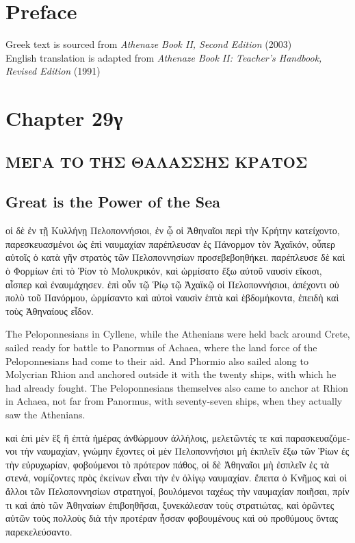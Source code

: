 \documentclass{article}
\begin{document}
\section{Preface}

Greek text is sourced from \emph{Athenaze Book II, Second Edition} (2003) \\
English translation is adapted from \emph{Athenaze Book II: Teacher's Handbook, Revised Edition} (1991) \\

\section{Chapter 29\textgreek{γ}}

\subsection*{\textgreek{ΜΕΓΑ ΤΟ ΤΗΣ ΘΑΛΑΣΣΗΣ ΚΡΑΤΟΣ}}
\subsection*{Great is the Power of the Sea}

\begin{greek}
οἱ δὲ ἐν τῇ Κυλλήνῃ Πελοποννήσιοι, ἐν ᾧ οἱ Ἀθηναῖοι περὶ τὴν Κρήτην κατείχοντο,
παρεσκευασμένοι ὡς ἐπὶ ναυμαχίαν παρέπλευσαν ἐς Πάνορμον τὸν Ἀχαϊκόν,
οὗπερ αὐτοῖς ὁ κατὰ γῆν στρατὸς τῶν Πελοποννησίων προσεβεβοηθήκει.
παρέπλευσε δὲ καὶ ὁ Φορμίων ἐπὶ τὸ Ῥίον τὸ Μολυκρικόν, καὶ ὡρμίσατο ἔξω αὐτοῦ ναυσὶν εἴκοσι, αἷσπερ καὶ ἐναυμάχησεν.
ἐπὶ οὖν τῷ Ῥίῳ τῷ Ἀχαϊκῷ οἱ Πελοποννήσιοι, ἀπέχοντι οὐ πολὺ τοῦ Πανόρμου,
ὡρμίσαντο καὶ αὐτοὶ ναυσὶν ἑπτὰ καὶ ἑβδομήκοντα, ἐπειδὴ καὶ τοὺς Ἀθηναίους εἶδον. \\
\end{greek}


The Peloponnesians in Cyllene, while the Athenians were held back around Crete,
sailed ready for battle to Panormus of Achaea,
where the land force of the Peloponnesians had come to their aid.
And Phormio also sailed along to Molycrian Rhion and anchored outside it with the twenty ships,
with which he had already fought.
The Peloponnesians themselves also came to anchor at Rhion in Achaea,
not far from Panormus, with seventy-seven ships, when they actually saw the Athenians. \\


\begin{greek}
καὶ ἐπὶ μὲν ἓξ ἢ ἑπτὰ ἡμέρας ἀνθώρμουν ἀλλήλοις,
μελετῶντές τε καὶ παρασκευαζόμενοι τὴν ναυμαχίαν,
γνώμην ἔχοντες οἱ μὲν Πελοποννήσιοι μὴ ἐκπλεῖν ἔξω τῶν Ῥίων ἐς τὴν εὐρυχωρίαν,
φοβούμενοι τὸ πρότερον πάθος, οἱ δὲ Ἀθηναῖοι μὴ ἐσπλεῖν ἐς τὰ στενά,
νομίζοντες πρὸς ἐκείνων εἶναι τὴν ἐν ὀλίγῳ ναυμαχίαν.
ἔπειτα ὁ Κνῆμος καὶ οἱ ἄλλοι τῶν Πελοποννησίων στρατηγοί, βουλόμενοι ταχέως τὴν ναυμαχίαν ποιῆσαι,
πρίν τι καὶ ἀπὸ τῶν Ἀθηναίων ἐπιβοηθῆσαι, ξυνεκάλεσαν τοὺς στρατιώτας,
καὶ ὁρῶντες αὐτῶν τοὺς πολλοὺς διὰ τὴν προτέραν ἧσσαν φοβουμένους
καὶ οὐ προθύμους ὄντας παρεκελεύσαντο. \\
\end{greek}
\end{document}
